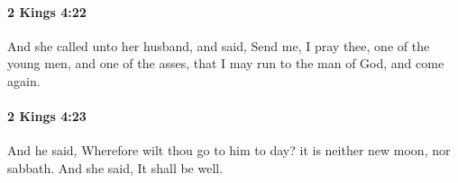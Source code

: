 		\paragraph{2 Kings 4:22} %
			\label{2KINGS-4-22}

			And she called unto her husband, and said, Send me, I pray thee, one of the young men, and one of the asses, that I may run to the man of God, and come again.


		\paragraph{2 Kings 4:23} %
			\label{2KINGS-4-23}

			And he said, Wherefore wilt thou go to him to day? it is neither new moon, nor sabbath. And she said, It shall be well.


